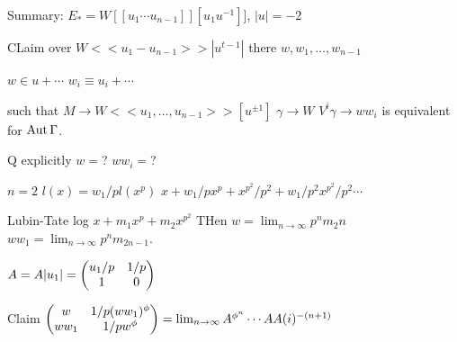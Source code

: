 Summary: 
$E_*= W[[u_1\cdots u_{n-1}]][u_1u^{-1}]]$, $|u|= -2$

CLaim over $W<<u_1-u_{n-1}>>|u^{t-1}|$
there $w,w_1,\ldots,w_{n-1}$

$w \in u + \cdots$
$w_i \equiv u_i + \cdots$

such that $M \to W<<u_1,\ldots,u_{n-1}>>[u^{\pm 1}]$
$\gamma \to W$
$V^i\gamma \to ww_i$
is equivalent for $\operatorname{Aut} \Gamma$.

Q explicitly $w=$?
$ww_i=$?

$n=2$ $l(x)= w_1/p l(x^p)$
$x+w_1/p x^p + x^{p^2}/p^2+ w_1/p^2 x^{p^2}/p^2 \cdots$

Lubin-Tate log
$x+ m_1x^p + m_2 x^{p^2}$
THen $w= \lim_{n \to \infty} p^n m_2n$
$ww_1= \lim_{n \to \infty} p^n m_{2n-1}$.

$A= A|u_1|= \begin{pmatrix} u_1/p & 1/p \\ 1 & 0 \end{pmatrix}$

Claim $\begin{pmatrix} w & 1/p(ww_1)^\phi \\ ww_1 & 1/pw^\phi \end{pmatrix}= \lim_{n \to \infty} A^{\phi^n} \cdots AA(i)^{-(n+1)}$




































